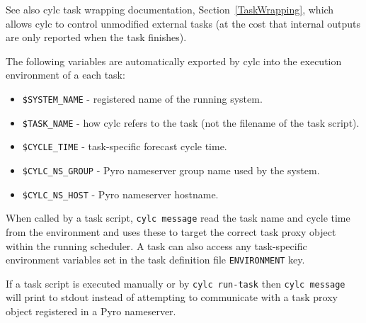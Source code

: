 
See also cylc task wrapping documentation, Section~\ref{TaskWrapping},
which allows cylc to control unmodified external tasks (at the cost that
internal outputs are only reported when the task finishes).

\lstset{language=bash}

The following variables are automatically exported by cylc into
the execution environment of a each task:
\begin{itemize}
   \item \lstinline=$SYSTEM_NAME= - registered name of the running system.
   \item \lstinline=$TASK_NAME= - how cylc refers to the task (not the
       filename of the task script). 
   \item \lstinline=$CYCLE_TIME= - task-specific forecast cycle time.
   \item \lstinline=$CYLC_NS_GROUP= - Pyro nameserver group name used by the system.
   \item \lstinline=$CYLC_NS_HOST= - Pyro nameserver hostname.
\end{itemize}

\lstset{language=bash=}
When called by a task script, \lstinline=cylc message= read the task
name and cycle time from the environment and uses these to target the
correct task proxy object within the running scheduler.
\lstset{language=cylctaskdef=}
A task can also access any task-specific
environment variables set in the task definition file
\lstinline=ENVIRONMENT= key.

\lstset{language=bash=}

If a task script is executed manually or by \lstinline=cylc run-task=
then \lstinline=cylc message= will print to stdout instead of attempting
to communicate with a task proxy object registered in a Pyro nameserver.
